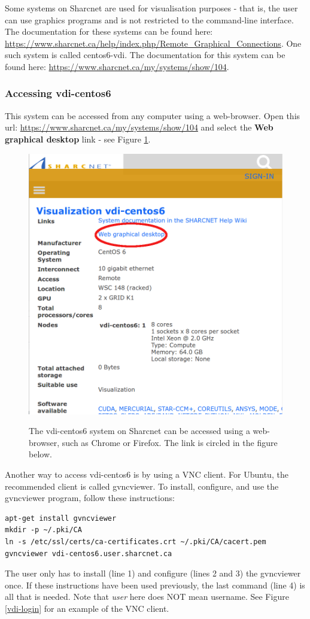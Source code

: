 \documentclass[12pt]{article}
\begin{document}
\quad Some systems on Sharcnet are used for visualisation purposes - that is, the user can use graphics programs and is not restricted to the command-line interface. The documentation for these systems can be found here: \url{https://www.sharcnet.ca/help/index.php/Remote_Graphical_Connections}. One such system is called centos6-vdi. The documentation for this system can be found here: \url{https://www.sharcnet.ca/my/systems/show/104}. 

\subsubsection{Accessing vdi-centos6}

\quad This system can be accessed from any computer using a web-browser. Open this url: \url{https://www.sharcnet.ca/my/systems/show/104} and select the \textbf{Web graphical desktop} link - see Figure \ref{vdi-link}.

\begin{figure}[H]
\centering
\caption{The vdi-centos6 system on Sharcnet can be accessed using a web-browser, such as Chrome or Firefox. The link is circled in the figure below.}
\includegraphics[width=.7\textwidth]{vdi-link}
\label{vdi-link}
\end{figure}

\quad Another way to access vdi-centos6 is by using a VNC client. For Ubuntu, the recommended client is called gvncviewer. To install, configure, and use the gvncviewer program, follow these instructions: 
\begin{lstlisting}
apt-get install gvncviewer
mkdir -p ~/.pki/CA
ln -s /etc/ssl/certs/ca-certificates.crt ~/.pki/CA/cacert.pem
gvncviewer vdi-centos6.user.sharcnet.ca
\end{lstlisting}
The user only has to install (line 1) and configure (lines 2 and 3) the gvncviewer once. If these instructions have been used previously, the last command (line 4) is all that is needed. Note that \textit{user} here does NOT mean username. See Figure \ref{vdi-login} for an example of the VNC client.
\end{document}
